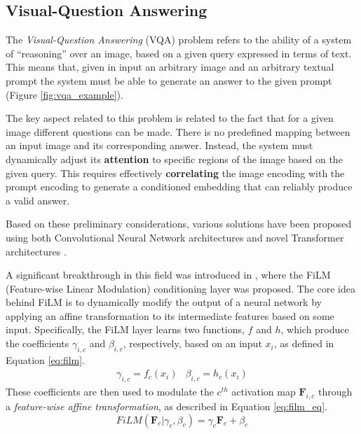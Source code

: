 \subsection{Visual-Question Answering}
\label{sec:vqa}
The \textit{Visual-Question Answering} (VQA) problem refers to the ability of a system of ``reasoning'' over an image, based on a given query expressed in terms of text. This means that, given in input an arbitrary image and an arbitrary textual prompt the system must be able to generate an answer to the given prompt (Figure \ref{fig:vqa_example}).


The key aspect related to this problem is related to the fact that for a given image different questions can be made. There is no predefined mapping between an input image and its corresponding answer. Instead, the system must dynamically adjust its \textbf{attention} to specific regions of the image based on the given query. This requires effectively \textbf{correlating} the image encoding with the prompt encoding to generate a conditioned embedding that can reliably produce a valid answer.

Based on these preliminary considerations, various solutions have been proposed using both Convolutional Neural Network architectures \cite{perez2018film} and novel Transformer architectures \cite{chen2022caan,chen2024mpcct,liu2024visual}.

A significant breakthrough in this field was introduced in \cite{perez2018film}, where the FiLM (Feature-wise Linear Modulation) conditioning layer was proposed. The core idea behind FiLM is to dynamically modify the output of a neural network by applying an affine transformation to its intermediate features based on some input. Specifically, the FiLM layer learns two functions, $f$ and $h$, which produce the coefficients $\gamma_{i,c}$ and $\beta_{i,c}$, respectively, based on an input $x_{i}$, as defined in Equation \ref{eq:film}.
\begin{equation}
    \label{eq:film}
    \begin{matrix}
        \gamma_{i,c} = f_{c}(x_{i}) & 
        \beta_{i,c} = h_{c}(x_{i})
    \end{matrix}
\end{equation}
These coefficients are then used to modulate the $c^{th}$ activation map $\textbf{F}_{i,c}$ through a \textit{feature-wise affine transformation}, as described in Equation \ref{eq:film_eq}.
\begin{equation}
    \label{eq:film_eq}
    FiLM(\textbf{F}_{c}|\gamma_{c}, \beta_{c}) = \gamma_{c} \textbf{F}_{c} + \beta_{c}
\end{equation}

